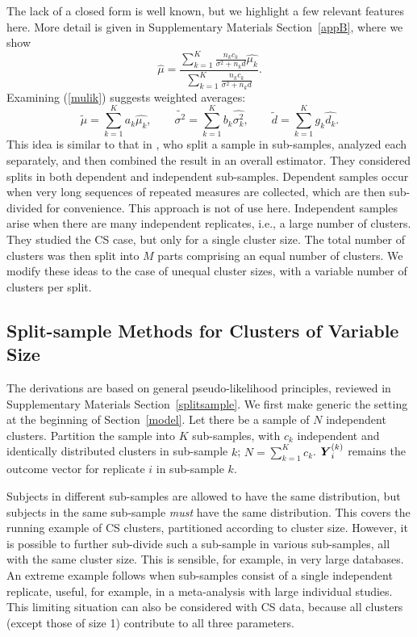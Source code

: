 \documentclass[11pt,a5paper,twoside]{book}
\newcommand{\BY}{\mbox{\boldmath $Y$}}
\begin{document}
The lack of a closed form is well known, but we highlight a few relevant features here. More detail is given in Supplementary Materials Section~\ref{appB},
where we show
\begin{equation}
\widehat{\mu}
=
\frac
{
\sum_{k=1}^K\frac{n_k c_k}{\sigma^2+n_k d} \widehat{\mu_k}
}
{
\sum_{k=1}^K\frac{n_k c_k}{\sigma^2+n_k d}
}.
\label{mulik}
\end{equation}
Examining (\ref{mulik}) suggests weighted averages:
\begin{equation}
\label{weightavermu}
\widetilde{\mu}=\sum_{k=1}^Ka_k\widehat{\mu_k},\qquad
\widetilde{\sigma^2}=\sum_{k=1}^Kb_k\widehat{\sigma^2_k},\qquad
\widetilde{d}=\sum_{k=1}^Kg_k\widehat{d_k}.
\end{equation}
This idea is  similar to that in \cite{Iddi2011}, who split a sample in sub-samples, analyzed each  separately, and then combined the result in an overall estimator. They considered splits in both dependent and independent sub-samples. Dependent samples occur when very long sequences of repeated measures are collected, which are then sub-divided for convenience. This approach is not of use here. Independent samples arise when there are many independent replicates, i.e., a large number of clusters. They studied the CS case, but only for a single cluster size. The total number of clusters was then split into $M$ parts comprising an equal number of clusters. We modify these ideas to the case of unequal cluster sizes, with a variable number of clusters per split.

\subsection{Split-sample Methods for Clusters of Variable Size}
\label{CSsplitsample}

The derivations are based on general pseudo-likelihood principles, reviewed in Supplementary Materials Section~\ref{splitsample}.
We first make generic the setting at the beginning of Section~\ref{model}. 
Let there be a sample of $N$ independent clusters. Partition the 
sample into $K$ sub-samples, with $c_k$ independent and identically 
distributed clusters in sub-sample $k$; $N=\sum_{k=1}^Kc_k$. 
$\BY_i^{(k)}$ remains the outcome vector for replicate $i$ in 
sub-sample $k$.

Subjects in different sub-samples are allowed to have 
the same distribution, but subjects in the same sub-sample 
{\em must\/} have the same distribution. This covers the running 
example of CS clusters, partitioned according to cluster size. 
However, it is possible to further sub-divide such a sub-sample 
in various sub-samples, all with the same cluster size. This is 
sensible, for example, in very large databases. An extreme example 
follows when sub-samples consist of a single independent replicate, useful, for example, in a meta-analysis with large individual 
studies. This limiting situation can also be considered with CS data, 
because all clusters (except those of size 1) contribute to all three 
parameters.
\end{document}

